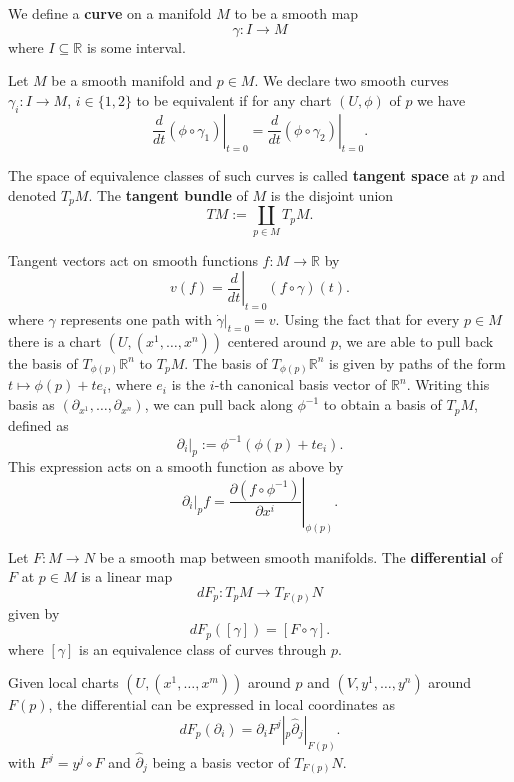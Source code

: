 We define a \textbf{curve} on a manifold $M$ to be a smooth map \[
\gamma: I \to M
\] 
where $I \subseteq \mathbb{R}$ is some interval.
\begin{definition}
    Let $M$ be a smooth manifold and $p \in M$. We declare two smooth curves $\gamma_i: I \to M$, $i \in \{1,2\}$ to be equivalent if for any chart $(U,\phi)$ of $p$ we have 
    \begin{equation}
        \left.\frac{d}{dt} (\phi \circ \gamma_1)\right|_{t=0} = \left.\frac{d}{dt} (\phi \circ \gamma_2)\right|_{t=0}.
    \end{equation}
    
    The space of equivalence classes of such curves is called \textbf{tangent space} at $p$ and denoted $T_pM$. The \textbf{tangent bundle} of $M$ is the disjoint union  \[
        TM := \coprod_{p \in M} T_pM
    .\] 
\end{definition}
Tangent vectors act on smooth functions $f: M \to \mathbb{R}$ by
\[
    v(f)=\left.\frac{d}{dt}\right|_{t=0}(f \circ \gamma)(t)
.\] 
where $\gamma$ represents one path with $\dot{\gamma}|_{t=0}=v$. 
Using the fact that for every $p \in M$ there is a chart $(U, (x^1, \dots, x^n))$ centered around $p$, we are able to pull back the basis of $T_{\phi(p)}\mathbb{R}^n$ to $T_pM$. The basis of $T_{\phi(p)}\mathbb{R}^n$ is given by paths of the form $t \mapsto \phi(p) +te_i$, where $e_i$ is the $i$-th canonical basis vector of $\mathbb{R}^n$. Writing this basis as $(\partial_{x^1}, \dots, \partial_{x^n})$, we can pull back along $\phi^{-1}$ to obtain a basis of $T_pM$, defined as
\[
    \partial_i|_p := \phi^{-1}(\phi(p)+te_i)
.\] This expression acts on a smooth function as above by
\[
    \partial_i|_p f = \left.\frac{\partial(f \circ \phi^{-1})}{\partial x^i}\right|_{\phi(p)}
.\] 
\begin{definition}[Differential]
    Let $F: M \to N$ be a smooth map between smooth manifolds. The \textbf{differential} of $F$ at $p \in M$ is a linear map 
    \[
        dF_p: T_pM \to T_{F(p)}N
    \]
    given by \[
        dF_p([\gamma])=[F \circ \gamma]
    .\] where $[\gamma]$ is an equivalence class of curves through $p$.
\end{definition}
Given local charts $(U, (x^1, \dots, x^m))$ around $p$ and $(V, y^1, \dots, y^n)$ around $F(p)$, the differential can be expressed in local coordinates as
\[
    dF_p (\partial_i) = \partial_i F^j|_p \hat{\partial}_j|_{F(p)}
.\] with $F^j = y^j \circ F$ and $\hat{\partial}_j$ being a basis vector of $T_{F(p)}N$.
